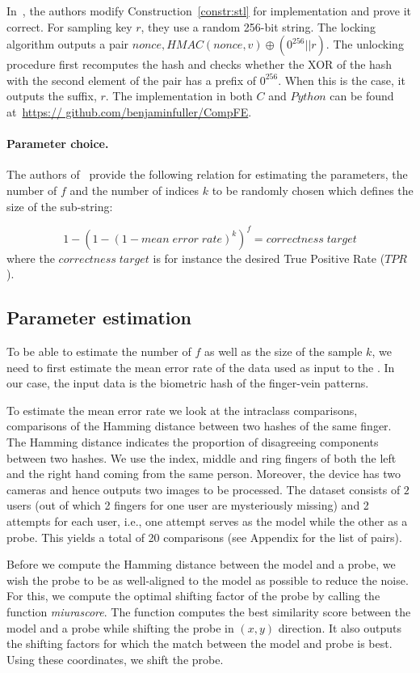 In~\cite{irisrfe}, the authors modify Construction~\ref{constr:stl} for implementation and prove it correct.
For sampling key $r$, they use a random 256-bit string.
The locking algorithm outputs a pair
$nonce, HMAC(nonce, v) \oplus (0^{256}||r)$.
The unlocking procedure first recomputes the hash and checks whether the XOR of the hash with the second element of the pair has a prefix of $0^{256}$. When this is the case, it outputs the suffix, $r$.
The implementation in both $C$ and $Python$ can be found at~\url{https:// github.com/benjaminfuller/CompFE}.

\paragraph{Parameter choice.} 
The authors of~\cite{irisrfe} provide the following relation for estimating the parameters, the number of \dls $f$ and the number of indices $k$ to be randomly chosen which defines the size of the sub-string: 

$$ 1- \left(1 - \left(1 - mean\;error\;rate \right)^k\right)^f = correctness\;target$$
where the $correctness\;target$ is for instance the desired True Positive Rate ($TPR$).



\subsection{Parameter estimation}\label{subsec:params}
To be able to estimate the number of \dls $f$ as well as the size of the sample $k$, we need to first estimate the mean error rate of the data used as input to the \fe. In our case, the input data is the biometric hash of the finger-vein patterns.

To estimate the mean error rate we look at the intraclass comparisons, comparisons of the Hamming distance between two hashes of the same finger. The Hamming distance indicates the proportion of disagreeing components between two hashes. We use the index, middle and ring fingers of both the left and the right hand coming from the same person. Moreover, the device has two cameras and hence outputs two images to be processed. The dataset consists of $2$ users (out of which 2 fingers for one user are mysteriously missing) and 2 attempts for each user, i.e., one attempt serves as the model while the other as a probe. This yields a total of 20 comparisons (see Appendix for the list of pairs). 

Before we compute the Hamming distance between the model and a probe, we wish the probe to be as well-aligned to the model as possible to reduce the noise. For this, we compute the optimal shifting factor of the probe by calling the function \textit{miurascore}. The function computes the best similarity score between the model and a probe while shifting the probe in $(x,y)$ direction. It also outputs the shifting factors for which the match between the model and probe is best. Using these coordinates, we shift the probe.



